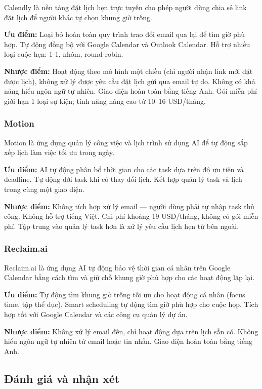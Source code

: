 \documentclass[../DoAn.tex]{subfiles}
\begin{document}
Calendly là nền tảng đặt lịch hẹn trực tuyến cho phép người dùng chia sẻ link đặt lịch để người khác tự chọn khung giờ trống.

\textbf{Ưu điểm:} Loại bỏ hoàn toàn quy trình trao đổi email qua lại để tìm giờ phù hợp. Tự động đồng bộ với Google Calendar và Outlook Calendar. Hỗ trợ nhiều loại cuộc hẹn: 1-1, nhóm, round-robin.

\textbf{Nhược điểm:} Hoạt động theo mô hình một chiều (chỉ người nhận link mới đặt được lịch), không xử lý được yêu cầu đặt lịch gửi qua email tự do. Không có khả năng hiểu ngôn ngữ tự nhiên. Giao diện hoàn toàn bằng tiếng Anh. Gói miễn phí giới hạn 1 loại sự kiện; tính năng nâng cao từ 10--16 USD/tháng.

\subsubsection{Motion}

Motion là ứng dụng quản lý công việc và lịch trình sử dụng AI để tự động sắp xếp lịch làm việc tối ưu trong ngày.

\textbf{Ưu điểm:} AI tự động phân bổ thời gian cho các task dựa trên độ ưu tiên và deadline. Tự động dời task khi có thay đổi lịch. Kết hợp quản lý task và lịch trong cùng một giao diện.

\textbf{Nhược điểm:} Không tích hợp xử lý email — người dùng phải tự nhập task thủ công. Không hỗ trợ tiếng Việt. Chi phí khoảng 19 USD/tháng, không có gói miễn phí. Tập trung vào quản lý task hơn là xử lý yêu cầu lịch hẹn từ bên ngoài.

\subsubsection{Reclaim.ai}

Reclaim.ai là ứng dụng AI tự động bảo vệ thời gian cá nhân trên Google Calendar bằng cách tìm và giữ chỗ khung giờ phù hợp cho các hoạt động lặp lại.

\textbf{Ưu điểm:} Tự động tìm khung giờ trống tối ưu cho hoạt động cá nhân (focus time, tập thể dục). Smart scheduling tự động tìm giờ phù hợp cho cuộc họp. Tích hợp tốt với Google Calendar và các công cụ quản lý dự án.

\textbf{Nhược điểm:} Không xử lý email đến, chỉ hoạt động dựa trên lịch sẵn có. Không hiểu ngôn ngữ tự nhiên từ email hoặc tin nhắn. Giao diện hoàn toàn bằng tiếng Anh.



\subsection{Đánh giá và nhận xét}
\end{document}
